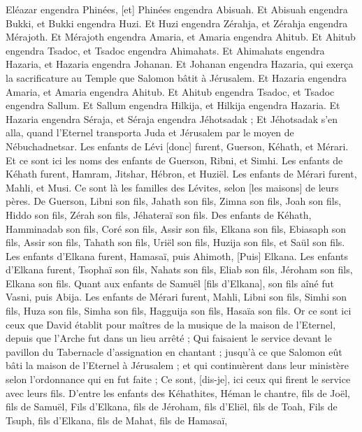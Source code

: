 \begin{multicols}{2}
Eléazar engendra Phinées, [et] Phinées engendra Abisuah.
Et Abisuah engendra Bukki, et Bukki engendra Huzi.
Et Huzi engendra Zérahja, et Zérahja engendra Mérajoth.
Et Mérajoth engendra Amaria, et Amaria engendra Ahitub.
Et Ahitub engendra Tsadoc, et Tsadoc engendra Ahimahats.
Et Ahimahats engendra Hazaria, et Hazaria engendra Johanan.
Et Johanan engendra Hazaria, qui exerça la sacrificature au Temple que Salomon bâtit à Jérusalem.
Et Hazaria engendra Amaria, et Amaria engendra Ahitub.
Et Ahitub engendra Tsadoc, et Tsadoc engendra Sallum.
Et Sallum engendra Hilkija, et Hilkija engendra Hazaria.
Et Hazaria engendra Séraja, et Séraja engendra Jéhotsadak ;
Et Jéhotsadak s'en alla, quand l'Eternel transporta Juda et Jérusalem par le moyen de Nébuchadnetsar.
Les enfants de Lévi [donc] furent, Guerson, Kéhath, et Mérari.
Et ce sont ici les noms des enfants de Guerson, Ribni, et Simhi.
Les enfants de Kéhath furent, Hamram, Jitshar, Hébron, et Huziël.
Les enfants de Mérari furent, Mahli, et Musi. Ce sont là les familles des Lévites, selon [les maisons] de leurs pères.
De Guerson, Libni son fils, Jahath son fils, Zimna son fils,
Joah son fils, Hiddo son fils, Zérah son fils, Jéhateraï son fils.
Des enfants de Kéhath, Hamminadab son fils, Coré son fils, Assir son fils,
Elkana son fils, Ebiasaph son fils, Assir son fils,
Tahath son fils, Uriël son fils, Huzija son fils, et Saül son fils.
Les enfants d'Elkana furent, Hamasaï, puis Ahimoth,
[Puis] Elkana. Les enfants d'Elkana furent, Tsophaï son fils, Nahats son fils,
Eliab son fils, Jéroham son fils, Elkana son fils.
Quant aux enfants de Samuël [fils d'Elkana], son fils aîné fut Vasni, puis Abija.
Les enfants de Mérari furent, Mahli, Libni son fils, Simhi son fils, Huza son fils,
Simha son fils, Hagguija son fils, Hasaïa son fils.
Or ce sont ici ceux que David établit pour maîtres de la musique de la maison de l'Eternel, depuis que l'Arche fut dans un lieu arrêté ;
Qui faisaient le service devant le pavillon du Tabernacle d'assignation en chantant ; jusqu'à ce que Salomon eût bâti la maison de l'Eternel à Jérusalem ; et qui continuèrent dans leur ministère selon l'ordonnance qui en fut faite ;
Ce sont, [dis-je], ici ceux qui firent le service avec leurs fils. D'entre les enfants des Kéhathites, Héman le chantre, fils de Joël, fils de Samuël,
Fils d'Elkana, fils de Jéroham, fils d'Eliël, fils de Toah,
Fils de Tsuph, fils d'Elkana, fils de Mahat, fils de Hamasaï,

\end{multicols}
